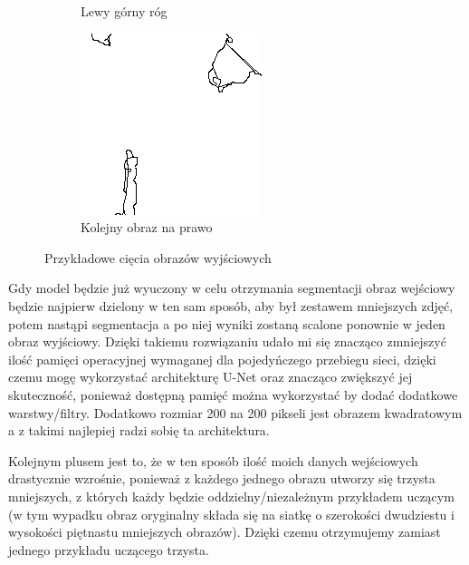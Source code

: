 \documentclass{article}
\begin{document}
\begin{figure}[H]
\begin{subfigure}{0.4\linewidth}
        \caption{Lewy górny róg}
    \end{subfigure}
    \begin{subfigure}{0.4\linewidth}
        \includegraphics[width=\linewidth]{images/edges0_0_1.png}
        \caption{Kolejny obraz na prawo}
    \end{subfigure}
    \caption{Przykładowe cięcia obrazów wyjściowych}
    \label{fig:input_split}
\end{figure}
Gdy model będzie już wyuczony w celu otrzymania segmentacji obraz wejściowy będzie najpierw dzielony w ten sam sposób, aby był zestawem mniejszych zdjęć, potem nastąpi segmentacja a po niej wyniki zostaną scalone ponownie w jeden obraz wyjściowy.
Dzięki takiemu rozwiązaniu udało mi się znacząco zmniejszyć ilość pamięci operacyjnej wymaganej dla pojedyńczego przebiegu sieci, dzięki czemu mogę wykorzystać architekturę U-Net oraz znacząco zwiększyć jej skuteczność, ponieważ dostępną pamięć można wykorzystać by dodać dodatkowe warstwy/filtry.
Dodatkowo rozmiar 200 na 200 pikseli jest obrazem kwadratowym a z takimi najlepiej radzi sobię ta architektura.

Kolejnym plusem jest to, że w ten sposób ilość moich danych wejściowych drastycznie wzrośnie, ponieważ z każdego jednego obrazu utworzy się trzysta mniejszych, z których każdy będzie oddzielny/niezależnym przykładem uczącym (w tym wypadku obraz oryginalny składa się na siatkę o szerokości dwudziestu i wysokości piętnastu mniejszych obrazów).
Dzięki czemu otrzymujemy zamiast jednego przykładu uczącego trzysta.
\end{document}
